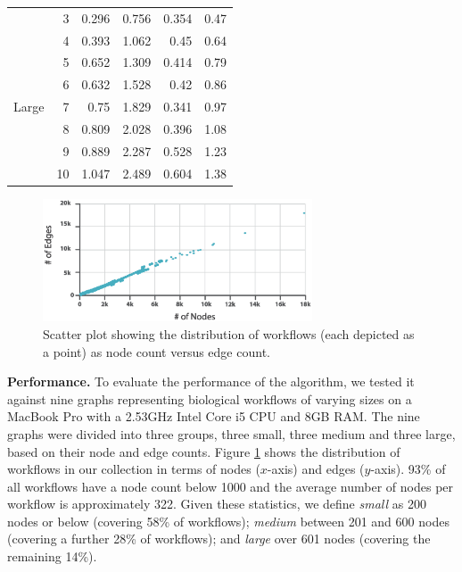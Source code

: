 \begin{table}[t!]
{\begin{tabular}{|l|r|r|r|r|r|}
\multicolumn{ 1}{|l|}{} & 3 & 0.296 & 0.756 & 0.354 & 0.47 \\ \cline{ 2- 6}
\multicolumn{ 1}{|l|}{} & 4 & 0.393 & 1.062 & 0.45 & 0.64 \\ \cline{ 2- 6}
\multicolumn{ 1}{|l|}{} & 5 & 0.652 & 1.309 & 0.414 & 0.79 \\ \cline{ 2- 6}
\multicolumn{ 1}{|l|}{} & 6 & 0.632 & 1.528 & 0.42 & 0.86 \\ \cline{ 2- 6}
\multicolumn{ 1}{|l|}{Large} & 7 & 0.75 & 1.829 & 0.341 & 0.97 \\ \cline{ 2- 6}
\multicolumn{ 1}{|l|}{} & 8 & 0.809 & 2.028 & 0.396 & 1.08 \\ \cline{ 2- 6}
\multicolumn{ 1}{|l|}{} & 9 & 0.889 & 2.287 & 0.528 & 1.23 \\ \cline{ 2- 6}
\multicolumn{ 1}{|l|}{} & 10 & 1.047 & 2.489 & 0.604 & 1.38 \\ \hline
\end{tabular}
}
\vspace{-2mm}
\end{table}

\begin{figure}[t]
\centering
\includegraphics[width=80mm]{images/automacron/workflow-size.eps}
\caption{Scatter plot showing the distribution of workflows (each depicted as a point) as node count versus edge count.}
\vspace{-4mm}
\label{fig:workflow-size}
\end{figure}


\noindent \textbf{Performance.}
To evaluate the performance of the algorithm, we tested it against nine graphs representing biological workflows of varying sizes on a MacBook Pro with a 2.53GHz Intel Core i5 CPU and 8GB RAM.
The nine graphs were divided into three groups, three small, three medium and three large, based on their node and edge counts.
Figure \ref{fig:workflow-size} shows the distribution of workflows in our collection in terms of nodes ($x$-axis) and edges ($y$-axis).
93\% of all workflows have a node count below 1000 and the average number of nodes per workflow is approximately 322.
Given these statistics, we define \emph{small} as 200 nodes or below (covering 58\% of workflows); \emph{medium} between 201 and 600 nodes (covering a further 28\% of workflows); and \emph{large} over 601 nodes (covering the remaining 14\%). 

